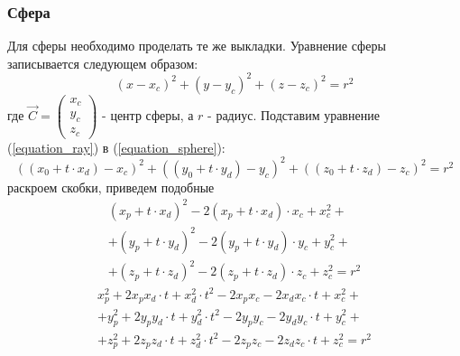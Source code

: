 \documentclass[12pt, a4paper]{article}
\def\VECXYZ#1{\left( \begin{array}{c} x_#1 \\ y_#1 \\ z_#1 \end{array} \right) }
\begin{document}
\subsubsection{Сфера}
Для сферы необходимо проделать те же выкладки.
Уравнение сферы записывается следующем образом:
\begin{equation}
(x-x_c)^2 + (y-y_c)^2 + (z-z_c)^2 = r^2
\label{equation_sphere}
\end{equation}
где $\vec{C} = \VECXYZ{c}$ - центр сферы, а $r$ - радиус. Подставим уравнение (\ref{equation_ray}) в (\ref{equation_sphere}):
$$
\left( (x_0 + t \cdot x_d) - x_c \right)^2 + 
\left( (y_0 + t \cdot y_d) - y_c \right)^2 + 
\left( (z_0 + t \cdot z_d) - z_c \right)^2 = r^2
$$
раскроем скобки, приведем подобные
\begin{multline*}
(x_p + t \cdot x_d)^2 - 2(x_p + t \cdot x_d)\cdot x_c + x_c^2 + \\
 + (y_p + t \cdot y_d)^2 - 2(y_p + t \cdot y_d)\cdot y_c + y_c^2 + \\
 + (z_p + t \cdot z_d)^2 - 2(z_p + t \cdot z_d)\cdot z_c + z_c^2 = r^2
\end{multline*}
\begin{multline*}
x^2_p + 2x_px_d\cdot t + x_d^2 \cdot t^2 - 2 x_px_c - 2 x_dx_c \cdot t + x_c^2 + \\
 + y^2_p + 2y_py_d\cdot t + y_d^2 \cdot t^2 - 2 y_py_c - 2 y_dy_c \cdot t + y_c^2 + \\
 + z^2_p + 2z_pz_d\cdot t + z_d^2 \cdot t^2 - 2 z_pz_c - 2 z_dz_c \cdot t + z_c^2 = r^2
\end{multline*}
\end{document}
